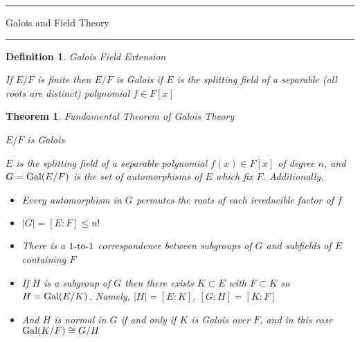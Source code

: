 \documentclass[12pt]{Qual}
\newtheorem{theorem}{Theorem}
\newtheorem{definition}{Definition}
\begin{document}
\begin{center}
\noindent\textcolor{red!60!black}{\rule{15cm}{1mm}}
\Huge \faBug\faPuzzlePiece\faCoffee Galois and Field Theory \faCoffee\faPuzzlePiece\faBug
\vspace{-0.5cm}
\noindent\textcolor{red!60!black}{\rule{15cm}{1mm}}
\end{center}
\vspace{0.5cm}
\begin{definition}{\Large\textit{Galois Field Extension}}
$\,$

If $E/F$ is finite then $E/F$ is Galois if $E$ is the splitting field of a separable (all roots are distinct) polynomial $f\in F[x]$

\end{definition}
\vspace{0.5cm}
\begin{theorem}{\Large\textit{Fundamental Theorem of Galois Theory}}

 $E/F$ is Galois
\vspace{-0.8cm}

\hspace{0.15cm}\begin{minipage}{0.85\textwidth}
\vspace{1cm}
 $E$ is the splitting field of a separable polynomial $f(x)\in F[x]$ of degree $n$, and $G=\text{Gal}(E/F)$ is the set of automorphisms of $E$ which fix $F$. Additionally,
\end{minipage}

\begin{itemize}[leftmargin=3.5cm]
\renewcommand\labelitemi{\faPuzzlePiece}
    \item Every automorphism in $G$ permutes the roots of each irreducible factor of $f$
    \item $|G|=[E:F]\le n!$
    \item There is a $1\text{-to-}1$ correspondence between subgroups of $G$ and subfields of $E$ containing $F$
    \item If $H$ is a subgroup of $G$ then there exists $K\subset E$ with $F\subset K$ so $H=\text{Gal}(E/K)$. Namely, $|H|=[E:K]$, $[G:H]=[K:F]$
    \item And $H$ is normal in $G$ if and only if $K$ is Galois over $F$, and in this case $\text{Gal}(K/F)\cong G/H$
\end{itemize}

\end{theorem}
\end{document}
